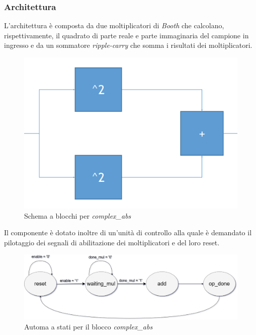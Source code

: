 \documentclass[12pt,a4paper,twoside,openany]{book}
\begin{document}
\subsubsection{Architettura}
L'architettura è composta da due moltiplicatori di \textit{Booth} che calcolano, rispettivamente, il quadrato di parte reale e parte immaginaria del campione in ingresso e da un sommatore \textit{ripple-carry} che somma i risultati dei moltiplicatori.

\begin{figure}[hb]
\begin{center}
\includegraphics[scale=0.5, keepaspectratio]{immagini/complexabs_schemablocchi}
\caption{Schema a blocchi per \textit{complex\_abs}}
\label{complexabs_schemablocchi}
\end{center}
\end{figure}

Il componente è dotato inoltre di un'unità di controllo alla quale è demandato il pilotaggio dei segnali di abilitazione dei moltiplicatori e del loro reset. 

\begin{figure}
\begin{center}
\includegraphics[width=\linewidth, keepaspectratio]{immagini/complexabs_fsm}
\caption{Automa a stati per il blocco \textit{complex\_abs}}
\label{complexabs_fsm}
\end{center}
\end{figure}
\end{document}
